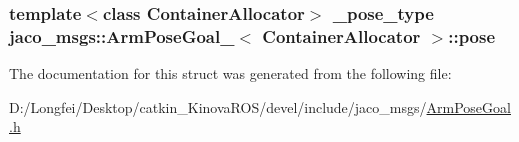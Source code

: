 \subsubsection[{\texorpdfstring{pose}{pose}}]{\setlength{\rightskip}{0pt plus 5cm}template$<$class Container\+Allocator$>$ {\bf \+\_\+pose\+\_\+type} {\bf jaco\+\_\+msgs\+::\+Arm\+Pose\+Goal\+\_\+}$<$ Container\+Allocator $>$\+::pose}\hypertarget{structjaco__msgs_1_1ArmPoseGoal___a3c02a8adbfcd7515a82e5a4746118e05}{}\label{structjaco__msgs_1_1ArmPoseGoal___a3c02a8adbfcd7515a82e5a4746118e05}


The documentation for this struct was generated from the following file\+:\begin{DoxyCompactItemize}
\item 
D\+:/\+Longfei/\+Desktop/catkin\+\_\+\+Kinova\+R\+O\+S/devel/include/jaco\+\_\+msgs/\hyperlink{ArmPoseGoal_8h}{Arm\+Pose\+Goal.\+h}\end{DoxyCompactItemize}
